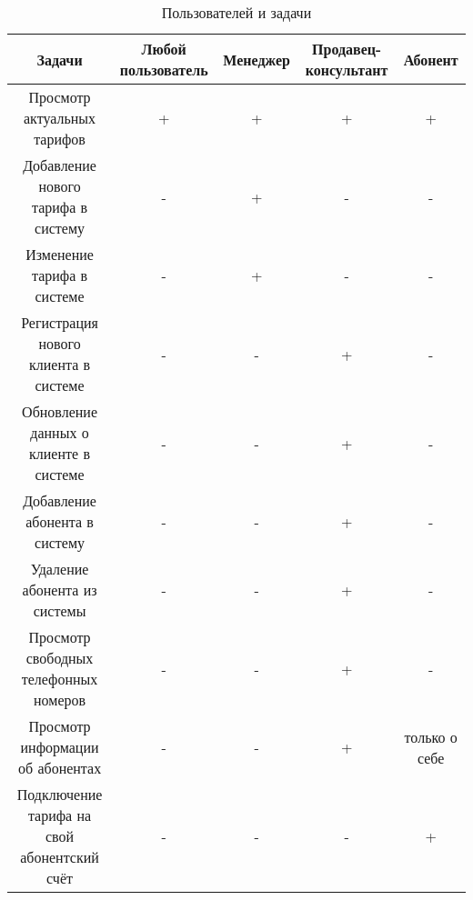 \renewcommand{\arraystretch}{1.5}
\begin{xltabular}[h]{\textwidth}{|C|C|C|C|C|}
    \caption{Пользователей и задачи\label{table:user-tasks}} \\
    \hline
    \textbf{Задачи}                             & \textbf{Любой пользователь} & \textbf{Менеджер} & \textbf{Продавец-консультант} & \textbf{Абонент} \\
    \hline \endhead
    Просмотр актуальных тарифов                 & +                           & +                 & +                             & +                \\
    \hline
    Добавление нового тарифа в систему          & -                           & +                 & -                             & -                \\
    \hline
    Изменение тарифа в системе                  & -                           & +                 & -                             & -                \\
    \hline
    Регистрация нового клиента в системе        & -                           & -                 & +                             & -                \\
    \hline
    Обновление данных о клиенте в системе       & -                           & -                 & +                             & -                \\
    \hline
    Добавление абонента в систему               & -                           & -                 & +                             & -                \\
    \hline
    Удаление абонента из системы                & -                           & -                 & +                             & -                \\
    \hline
    Просмотр свободных телефонных номеров       & -                           & -                 & +                             & -                \\
    \hline
    Просмотр информации об абонентах            & -                           & -                 & +                             & только о себе    \\
    \hline
    Подключение тарифа на свой абонентский счёт & -                           & -                 & -                             & +                \\
    \hline
\end{xltabular}